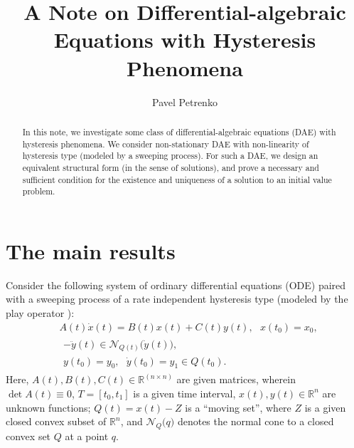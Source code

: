 \documentclass[12pt]{llncs}
\begin{document}
%
\fi
\title{A Note on Differential-algebraic Equations with Hysteresis Phenomena}
\author{Pavel Petrenko
}


\maketitle

\begin{abstract}
In this note, we investigate some class of differential-algebraic equations (DAE) with hysteresis phenomena. We consider non-stationary DAE with non-linearity of hysteresis type (modeled by a sweeping process). For such a DAE, we design an equivalent structural form (in the sense of solutions), and prove a necessary and sufficient condition for the existence and uniqueness of a solution to an initial value problem.

\end{abstract}

\section{The main results}

Consider the following system of ordinary differential equations (ODE) paired with a sweeping process \cite{pppKM2000,pppMoreau1977} of a rate independent hysteresis type  (modeled by the play operator \cite{pppBS1996,pppKr1991}):
\begin{align} \label{ppppss1}
 & A(t)\dot{x}(t)=B(t)x(t)+C(t)y(t), \ \ \ x(t_0)=x_0,   
\\[0.5em] & 
\begin{array}{c}
  -\ddot{y}(t)\in \mathcal{N}_{Q(t)}\big(\dot{y}(t)\big), \\[0.5em] 
 {y}(t_0)=y_0, \ \  \  \dot{y}(t_0)=y_1\in Q(t_0).  
  \end{array} \label{ppppss2}
\end{align}
Here, $A(t), B(t), C(t) \in \mathbb R^{(n\times n)}$ are given matrices, wherein $\det A(t) \equiv 0$, $T=[t_0,t_1]$ is a given time interval, $x(t), y(t) \in {\mathbb R}^n$ are unknown functions; $Q(t)=x(t)-Z$ is a ``moving set'', where $Z$ is a given closed convex subset of ${\mathbb R}^n$, and $\mathcal{N}_{Q}\big(q\big)$ denotes the normal cone to a closed convex set $Q$ at a point $q$.
\end{document}
